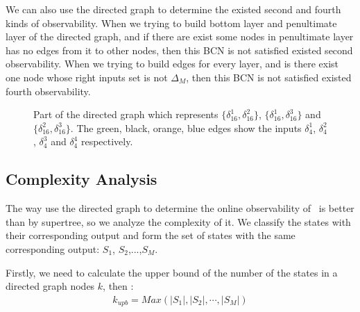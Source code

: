 We can also use the directed graph to determine the existed second and fourth kinds of observability. When we trying to build bottom layer and penultimate layer of the directed graph, and if there are exist some nodes in penultimate layer has no edges from it to other nodes, then this BCN is not satisfied existed second observability. When we trying to build edges for every layer, and is there exist one node whose right inputs set is not $\Delta_M$, then this BCN is not satisfied existed fourth observability.
\begin{figure}[thpb]
      \centering
      
      \caption{Part of the directed graph which represents $\{\delta_{16}^1,\delta_{16}^2\}$, $\{\delta_{16}^1,\delta_{16}^3\}$ and $\{\delta_{16}^2,\delta_{16}^3\}$. The green, black, orange, blue edges show the inputs $\delta_4^1$, $\delta_4^2$, $\delta_4^3$ and $\delta_4^4$ respectively.}
      \label{fig:4}
   \end{figure}
\subsection{Complexity Analysis}
The way use the directed graph to determine the online observability of \BCNs\ is better than by supertree, so we analyze the complexity of it. We classify the states with their corresponding output and form the set of states with the same corresponding output: $S_1$, $S_2$,...,$S_M$.

Firstly, we need to calculate the upper bound of the number of the states in a directed graph nodes $k$, then :
\begin{equation}
\begin{split}
k_{upb}= Max(|S_1|,|S_2|,\cdots,|S_M|)
\end{split}
\end{equation}

